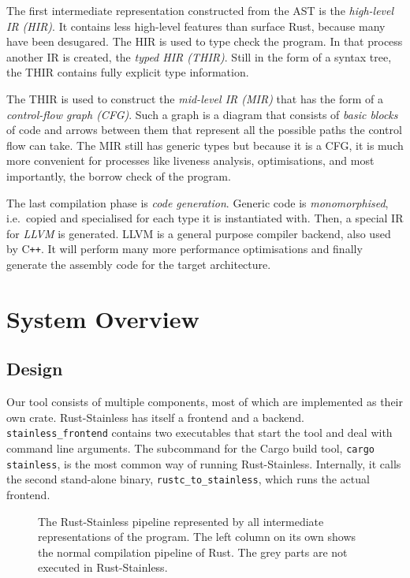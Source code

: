 The first intermediate representation constructed from the AST is the
\emph{high-level IR (HIR)}. It contains less high-level features than surface
Rust, because many have been desugared. The HIR is used to type check the
program. In that process another IR is created, the \emph{typed HIR (THIR)}.
Still in the form of a syntax tree, the THIR contains fully explicit type
information.

The THIR is used to construct the \emph{mid-level IR (MIR)} that has the form of
a \emph{control-flow graph (CFG)}. Such a graph is a diagram that consists of
\emph{basic blocks} of code and arrows between them that represent all the
possible paths the control flow can take. The MIR still has generic types but
because it is a CFG, it is much more convenient for processes like liveness
analysis, optimisations, and most importantly, the borrow check of the program.

The last compilation phase is \emph{code generation}. Generic code is
\emph{monomorphised}, i.e.~copied and specialised for each type it is
instantiated with. Then, a special IR for \emph{LLVM} \cite{llvm} is generated.
LLVM is a general purpose compiler backend, also used by C\texttt{++}. It will
perform many more performance optimisations and finally generate the assembly
code for the target architecture.

\section{System Overview}

\subsection{Design}

Our tool consists of multiple components, most of which are implemented as their
own crate. Rust-Stainless has itself a frontend and a backend.
\lstinline!stainless_frontend! contains two executables that start the tool and
deal with command line arguments. The subcommand for the Cargo build tool,
\passthrough{\lstinline!cargo stainless!}, is the most common way of running
Rust-Stainless. Internally, it calls the second stand-alone binary,
\lstinline!rustc_to_stainless!, which runs the actual frontend.

\begin{figure}
  \begin{center}
  
  \caption{
    The Rust-Stainless pipeline represented by all intermediate representations
    of the program. The left column on its own shows the normal compilation
    pipeline of Rust. The grey parts are not executed in Rust-Stainless.
  }
  \label{fig:flowchart}
  \end{center}
\end{figure}

